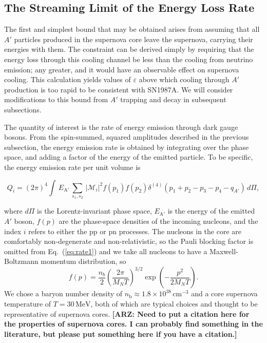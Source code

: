 \documentclass[nofootinbib,prd,superscriptaddress,twocolumn]{revtex4}
\newcommand{\beq}{\begin{equation}}
\newcommand{\eeq}{\end{equation}}
\newcommand{\qa}{q_{A'}}
\newcommand{\arz}[1]{{{\bf{\color{BrickRed}[ARZ: #1]}}}}
\begin{document}
\subsection{The Streaming Limit of the Energy Loss Rate}

The first and simplest bound that may be obtained arises from assuming that all $A'$ particles produced in the supernova core 
leave the supernova, carrying their energies with them. The constraint can be derived simply by 
requiring that the energy loss through this cooling channel be less than the cooling from neutrino emission; 
any greater, and it would have an observable effect on supernova cooling. This calculation yields values of 
$\varepsilon$ above which cooling through $A'$ production is too rapid to be consistent with SN1987A. 
We will consider modifications to this bound from $A'$ trapping and decay in subsequent subsections.

The quantity of interest is the rate of energy emission through dark gauge bosons. 
From the spin-summed, squared amplitudes described in the previous subsection, 
the energy emission rate is obtained by integrating over the phase space, 
and adding a factor of the energy of the emitted particle. To be specific, the 
energy emission rate per unit volume is 
%
\begin{widetext}
\beq
\label{eq:rate1}
Q_i = (2\pi)^4 \int\, E_{\mathrm{A}'} \, \sum_{s_1,s_2}\, \vert \mathcal{M}_i \vert^2 f(p_1) f(p_2)\delta^{(4)}(p_1+p_2-p_3-p_4-\qa)\, d\Pi,
\eeq
\end{widetext}
%
where $d\Pi$ is the Lorentz-invariant phase space, 
$ E_{\mathrm{A}'}$ is the energy of the emitted $A'$ boson, 
$f(p)$ are the phase-space densities of the incoming nucleons, and 
the index $i$ refers to either the pp or pn processes. 
The nucleons in the core are comfortably non-degenerate and non-relativistic, 
so the Pauli blocking factor is omitted from Eq.~(\ref{eq:rate1}) and we take 
all nucleons to have a Maxwell-Boltzmann momentum distribution, so 
\beq
f(p) =  \frac{n_b}{2} \left( \frac{2 \pi}{M_N T} \right)^{3/2} \exp \left(-\frac{p^2}{2 M_N T} \right).
\eeq
%
We chose a baryon number density of $n_{\mathrm{b}} \approx 1.8 \times 10^{38}\, \mathrm{cm}^{-3}$ and a 
core supernova temperature of $T = 30\, \mathrm{MeV}$, both of which are typical choices and thought to 
be representative of supernova cores. \arz{Need to put a citation here for the properties of supernova cores. 
I can probably find something in the literature, but please put something here if you have a citation.}
\end{document}
